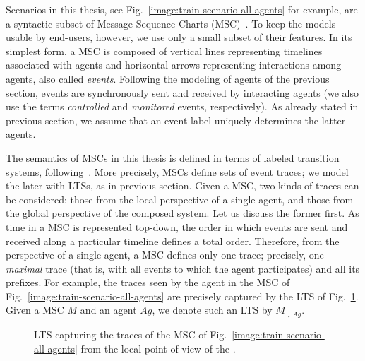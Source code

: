 Scenarios in this thesis, see Fig.~\ref{image:train-scenario-all-agents} for example, are a syntactic subset of Message Sequence Charts (MSC)~\cite{ITU:1996}. To keep the models usable by end-users, however, we use only a small subset of their features. In its simplest form, a MSC is composed of vertical lines representing timelines associated with agents and horizontal arrows representing interactions among agents, also called \emph{events}. Following the modeling of agents of the previous section, events are synchronously sent and received by interacting agents (we also use the terms \emph{controlled} and \emph{monitored} events, respectively). As already stated in previous section, we assume that an event label uniquely determines the latter agents. 

The semantics of MSCs in this thesis is defined in terms of labeled transition systems, following~\cite{Uchitel:2003}. More precisely, MSCs define sets of event traces; we model the later with LTSs, as in previous section. Given a MSC, two kinds of traces can be considered: those from the local perspective of a single agent, and those from the global perspective of the composed system. Let us discuss the former first. As time in a MSC is represented top-down, the order in which events are sent and received along a particular timeline defines a total order. Therefore, from the perspective of a single agent, a MSC defines only one trace; precisely, one \emph{maximal} trace (that is, with all events to which the agent participates) and all its prefixes. For example, the traces seen by the  agent in the MSC of Fig.~\ref{image:train-scenario-all-agents} are precisely captured by the LTS of Fig.~\ref{image:local-traces-lts}. Given a MSC $M$ and an agent $Ag$, we denote such an LTS by $M_{\downarrow Ag}$.

\vspace{0.5cm}
\begin{figure}[H]\centering
{}
\caption{LTS capturing the traces of the MSC of Fig.~\ref{image:train-scenario-all-agents} from the local point of view of the .\label{image:local-traces-lts}}
\end{figure}

